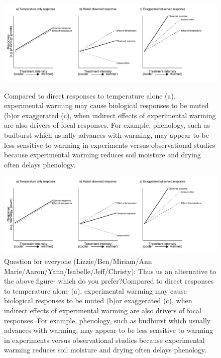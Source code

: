 \documentclass{article}
\begin{document}
 \clearpage
 \begin{figure}[h]
 \centering
 \includegraphics{../figures/DirIndWarmingEffects.pdf}    
 \caption{Compared to direct responses to temperature alone (a), experimental warming may cause biological responses to be muted (b)or exaggerated (c), when indirect effects of experimental warming are also drivers of focal responses. For example, phenology, such as budburst which usually advances with warming, may appear to be less sensitive to warming in experiments versus observational studies \citep{wolkovich2012} because experimental warming reduces soil moisture and drying often delays phenology.} 
\includegraphics{../figures/DirIndWarmingEffects.pdf}    
 \caption{Question for everyone (Lizzie/Ben/Miriam/Ann Marie/Aaron/Yann/Isabelle/Jeff/Christy): Thus us an alternative to the above figure- which do you prefer?Compared to direct responses to temperature alone (a), experimental warming may cause biological responses to be muted (b)or exaggerated (c), when indirect effects of experimental warming are also drivers of focal responses. For example, phenology, such as budburst which usually advances with warming, may appear to be less sensitive to warming in experiments versus observational studies \citep{wolkovich2012} because experimental warming reduces soil moisture and drying often delays phenology.} 
\end{figure}
\clearpage

\end{document}
